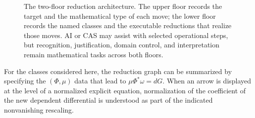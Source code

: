 \documentclass[11pt]{article}
\theoremstyle{definition}
\begin{document}
\begin{figure}[ht]
\centering
{}
\caption{The two-floor reduction architecture. The upper floor records the target and the mathematical type of each move; the lower floor records the named classes and the executable reductions that realize those moves. AI or CAS may assist with selected operational steps, but recognition, justification, domain control, and interpretation remain mathematical tasks across both floors.}
\label{fig:twofloors}
\end{figure}

For the classes considered here, the reduction graph can be summarized by specifying the \((\Phi,\mu)\) data that lead to \(\mu\Phi^*\omega=dG\). When an arrow is displayed at the level of a normalized explicit equation, normalization of the coefficient of the new dependent differential is understood as part of the indicated nonvanishing rescaling.
\end{document}
